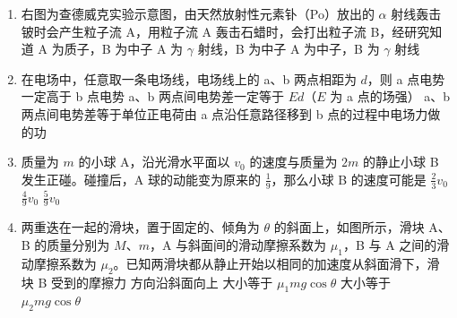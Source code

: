 \documentclass[\gkver]{gaokaozhenti}
\begin{document}
\begin{enumerate}
\item
右图为查德威克实验示意图，由天然放射性元素钋（Po）放出的 $\alpha$ 射线轰击铍时会产生粒子流 A，用粒子流 A 轰击石蜡时，会打出粒子流 B，经研究知道
\onepicture[w=7.20cm]{}
{A 为质子，B 为中子}
{A 为 $\gamma$ 射线，B 为中子}
{A 为中子，B 为 $\gamma$ 射线}

\item
在电场中，任意取一条电场线，电场线上的 a、b 两点相距为 $d$，则
\onepicture[w=5.00cm]{}
{a 点电势一定高于 b 点电势}
{a、b 两点间电势差一定等于 $Ed$（$E$ 为 a 点的场强）}
{a、b 两点间电势差等于单位正电荷由 a 点沿任意路径移到 b 点的过程中电场力做的功}

\item
质量为 $m$ 的小球 A，沿光滑水平面以 $v_{0}$ 的速度与质量为 $2m$ 的静止小球 B 发生正碰。碰撞后，A 球的动能变为原来的 $\frac{1}{9}$，那么小球 B 的速度可能是
{$\frac{2}{3}v_{0}$}
{$\frac{4}{9}v_{0}$}
{$\frac{5}{9}v_{0}$}

\item
两重迭在一起的滑块，置于固定的、倾角为 $\theta$ 的斜面上，如图所示，滑块 A、B 的质量分别为 $M$、$m$，A 与斜面间的滑动摩擦系数为 $\mu_{1}$，B 与 A 之间的滑动摩擦系数为 $\mu_{2}$。已知两滑块都从静止开始以相同的加速度从斜面滑下，滑块 B 受到的摩擦力
\onepicture[w=6.01cm]{}
{方向沿斜面向上}
{大小等于 $\mu_{1}mg\cos\theta$}
{大小等于 $\mu_{2}mg\cos\theta$}


\end{enumerate}
\end{document}
